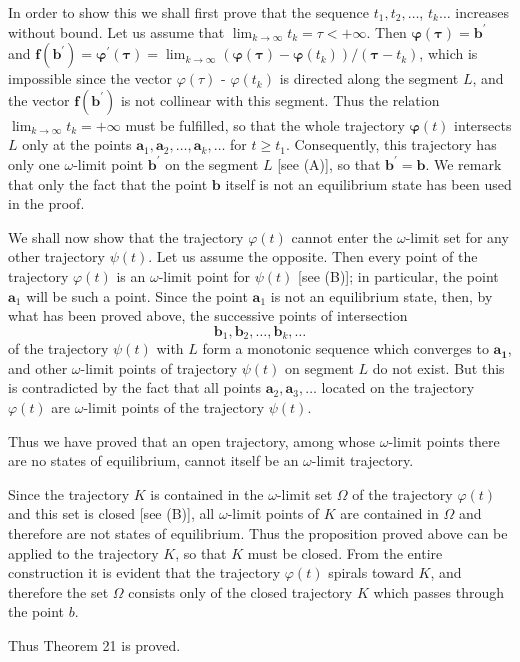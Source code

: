 \documentclass[10pt,a5paper]{book}
\makeatletter
\theoremstyle{plain}
\theoremstyle{definition}
\theoremstyle{remark}
\renewenvironment{proof}[1][\proofname]{\par
  \pushQED{\qed}%
  \normalfont\topsep6\p@\@plus6\p@\relax
  \trivlist
  \item\relax{\itshape #1\@addpunct{.}}\hspace\labelsep\ignorespaces
}{\popQED\endtrivlist\@endpefalse}
\makeatother
\begin{document}
\begin{proof}
In order to show this we shall first prove that the sequence $t_{1}, t_{2}, \ldots$, $t_{k} \ldots$ increases without bound. Let us assume that $\lim _{k \rightarrow \infty} t_{k}=\tau<+\infty$. Then $\boldsymbol{\varphi}(\boldsymbol{\tau})=\mathbf{b}^{\prime}$ and $\mathbf{f}\left(\mathbf{b}^{\prime}\right)=\boldsymbol{\varphi}^{\prime}(\boldsymbol{\tau})=\lim _{k \rightarrow \infty}\left(\boldsymbol{\varphi}(\boldsymbol{\tau})-\boldsymbol{\varphi}\left(t_{k}\right)\right) /\left(\boldsymbol{\tau}-t_{k}\right)$, which is impossible since the vector $\varphi(\tau)$ - $\varphi\left(t_{k}\right)$ is directed along the segment $L$, and the vector $\mathbf{f}\left(\mathbf{b}^{\prime}\right)$ is not collinear with this segment. Thus the relation $\lim _{k \rightarrow \infty} t_{k}=+\infty$ must be fulfilled, so that the whole trajectory $\boldsymbol{\varphi}(t)$ intersects $L$ only at the points $\mathbf{a}_{1}, \mathbf{a}_{2}, \ldots, \mathbf{a}_{k}, \ldots$ for $t \geq t_{1}$. Consequently, this trajectory has only one $\omega$-limit point $\mathbf{b}^{\prime}$ on the segment $L$ [see (A)], so that $\mathbf{b}^{\prime}=\mathbf{b}$. We remark that only the fact that the point $\mathbf{b}$ itself is not an equilibrium state has been used in the proof.

We shall now show that the trajectory $\varphi(t)$ cannot enter the $\omega$-limit set for any other trajectory $\psi(t)$. Let us assume the opposite. Then every point of the trajectory $\varphi(t)$ is an $\omega$-limit point for $\psi(t)$ [see (B)]; in particular, the point $\mathbf{a}_{1}$ will be such a point. Since the point $\mathbf{a}_{1}$ is not an equilibrium state, then, by what has been proved above, the successive points of intersection
\[
\mathbf{b}_{1}, \mathbf{b}_{2}, \ldots, \mathbf{b}_{k}, \ldots
\]
of the trajectory $\psi(t)$ with $L$ form a monotonic sequence which converges to $\mathbf{a}_{\mathbf{1}}$, and other $\omega$-limit points of trajectory $\psi(t)$ on segment $L$ do not exist. But this is contradicted by the fact that all points $\mathbf{a}_{2}, \mathbf{a}_{3}, \ldots$ located on the trajectory $\varphi(t)$ are $\omega$-limit points of the trajectory $\psi(t)$.

Thus we have proved that an open trajectory, among whose $\omega$-limit points there are no states of equilibrium, cannot itself be an $\omega$-limit trajectory.

Since the trajectory $K$ is contained in the $\omega$-limit set $\Omega$ of the trajectory $\varphi(t)$ and this set is closed [see (B)], all $\omega$-limit points of $K$ are contained in $\Omega$ and therefore are not states of equilibrium. Thus the proposition proved above can be applied to the trajectory $K$, so that $K$ must be closed. From the entire construction it is evident that the trajectory $\varphi(t)$ spirals toward $K$, and therefore the set $\Omega$ consists only of the closed trajectory $K$ which passes through the point $b$.

Thus Theorem 21 is proved.
\end{proof}
\end{document}
